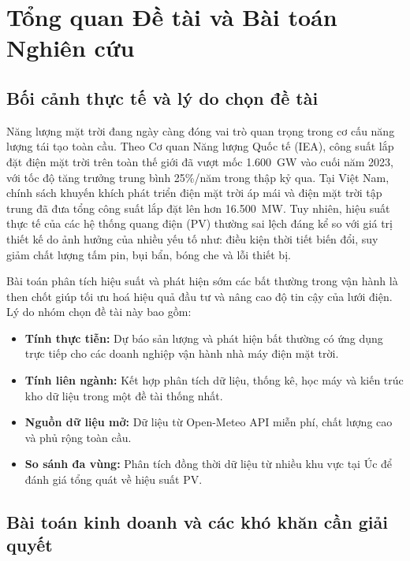 \documentclass[12pt, a4paper]{report}
\begin{document}
\newpage
\pagestyle{main}

\chapter{Tổng quan Đề tài và Bài toán Nghiên cứu}
\label{chap:tongquan}

\section{Bối cảnh thực tế và lý do chọn đề tài}
\label{sec:lydo}

Năng lượng mặt trời đang ngày càng đóng vai trò quan trọng trong cơ cấu năng lượng tái tạo toàn cầu. Theo Cơ quan Năng lượng Quốc tế (IEA), công suất lắp đặt điện mặt trời trên toàn thế giới đã vượt mốc 1.600~GW vào cuối năm 2023, với tốc độ tăng trưởng trung bình 25\%/năm trong thập kỷ qua. Tại Việt Nam, chính sách khuyến khích phát triển điện mặt trời áp mái và điện mặt trời tập trung đã đưa tổng công suất lắp đặt lên hơn 16.500~MW. Tuy nhiên, hiệu suất thực tế của các hệ thống quang điện (PV) thường sai lệch đáng kể so với giá trị thiết kế do ảnh hưởng của nhiều yếu tố như: điều kiện thời tiết biến đổi, suy giảm chất lượng tấm pin, bụi bẩn, bóng che và lỗi thiết bị.

Bài toán phân tích hiệu suất và phát hiện sớm các bất thường trong vận hành là then chốt giúp tối ưu hoá hiệu quả đầu tư và nâng cao độ tin cậy của lưới điện. Lý do nhóm chọn đề tài này bao gồm:
\begin{itemize}[noitemsep]
    \item \textbf{Tính thực tiễn:} Dự báo sản lượng và phát hiện bất thường có ứng dụng trực tiếp cho các doanh nghiệp vận hành nhà máy điện mặt trời.
    \item \textbf{Tính liên ngành:} Kết hợp phân tích dữ liệu, thống kê, học máy và kiến trúc kho dữ liệu trong một đề tài thống nhất.
    \item \textbf{Nguồn dữ liệu mở:} Dữ liệu từ Open-Meteo API miễn phí, chất lượng cao và phủ rộng toàn cầu.
    \item \textbf{So sánh đa vùng:} Phân tích đồng thời dữ liệu từ nhiều khu vực tại Úc để đánh giá tổng quát về hiệu suất PV.
\end{itemize}

\section{Bài toán kinh doanh và các khó khăn cần giải quyết}
\label{sec:problem}
\end{document}
